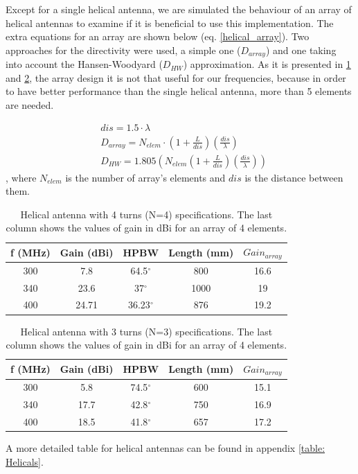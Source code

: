 Except for a single helical antenna, we are simulated the behaviour of an array of helical antennas to examine if it is beneficial to use this implementation. The extra equations for an array are shown below (eq. \ref{helical_array}). Two approaches for the directivity were used, a simple one ($D_{array}$) and one taking into account the Hansen-Woodyard ($D_{HW}$) approximation. As it is presented in \ref{table: Helicals1} and \ref{table: Helicals2}, the array design it is not that useful for our frequencies, because in order to have better performance than the single helical antenna, more than 5 elements are needed.

\begin{subequations}
\begin{align}
    &dis=1.5 \cdot \lambda \\
    &D_{array}=N_{elem} \cdot (1+\frac{L}{dis})(\frac{dis}{\lambda}) \\
    &D_{HW}=1.805(N_{elem}(1+\frac{L}{dis})(\frac{dis}{\lambda})) 
\end{align}
\label{helical_array}
\end{subequations}
, where $N_{elem}$ is the number of array's elements and $dis$ is the distance between them. 

\begin{table}[H]
\centering
\begin{tabular}{| c | c | c | c | c |}
\hline
 f (MHz) & Gain (dBi) & HPBW & Length (mm) & $Gain_{array}$ \\ 
 \hline
 300 & 7.8 & 64.5$^\circ$ & 800 & 16.6 \\  
 \hline
 340 & 23.6 & 37$^\circ$ & 1000 & 19\\
 \hline
  400 & 24.71 & 36.23$^\circ$ & 876 & 19.2 \\
 \hline
\end{tabular}
\caption{Helical antenna with 4 turns (N=4) specifications. The last column shows the values of gain in dBi for an array of 4 elements.}
\label{table: Helicals1}
\end{table}

\begin{table}[H]
\centering
\begin{tabular}{| c | c | c | c | c |}
\hline
 f (MHz) & Gain (dBi) & HPBW & Length (mm) & $Gain_{array}$ \\ 
 \hline
 300 & 5.8 & 74.5$^\circ$ & 600 & 15.1 \\  
 \hline
 340 & 17.7 & 42.8$^\circ$ & 750 & 16.9\\
 \hline
  400 & 18.5 & 41.8$^\circ$ & 657 & 17.2 \\
 \hline
\end{tabular}
\caption{Helical antenna with 3 turns (N=3) specifications. The last column shows the values of gain in dBi for an array of 4 elements.}
\label{table: Helicals2}
\end{table}
A more detailed table for helical antennas can be found in appendix \ref{table: Helicals}.

